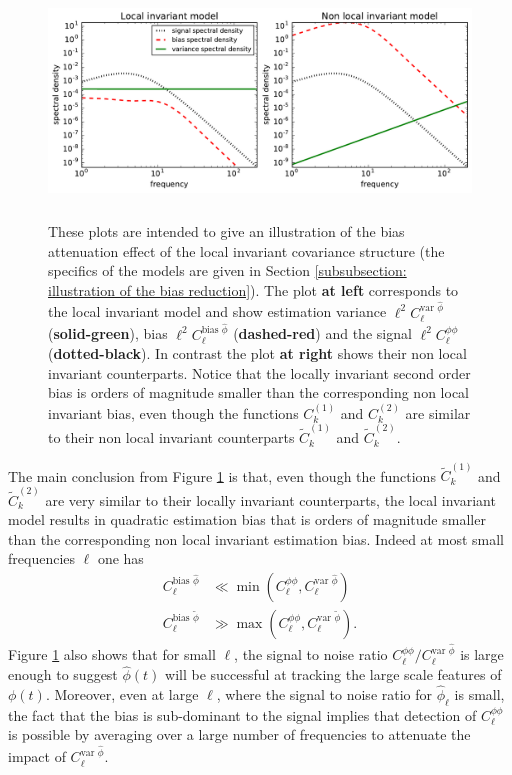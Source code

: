 \documentclass[10pt,noinfoline]{imsart}
\begin{document}
\begin{figure}[H]
\includegraphics[height=6.2cm]{figure1.pdf}
\caption{
 These plots are intended to give an illustration  of the bias attenuation effect of the local invariant covariance structure (the specifics of the models are given in Section \ref{subsubsection: illustration of the bias reduction}).  The plot \textbf{at left} corresponds to the local invariant model and show estimation variance $\ell^2 C_{\ell}^{\text{var }\hat \phi}$ (\textbf{solid-green}), bias $\ell^2 C_{\ell}^{\text{bias }\hat \phi}$ (\textbf{dashed-red}) and the signal $\ell^2 C_{\ell}^{\phi\phi}$ (\textbf{dotted-black}). In contrast the plot \textbf{at right} shows their non local invariant counterparts.  Notice that the locally invariant second order bias is orders of magnitude smaller than the corresponding non local invariant bias, even though the functions $ C^{(1)}_k$ and $ C^{(2)}_k$ are similar to their non local invariant counterparts  $\widetilde C^{(1)}_k$ and $\widetilde C^{(2)}_k$. }
\label{Figure 1}
\end{figure}

The main conclusion from Figure \ref{Figure 1} is that, even though the functions $\widetilde C^{(1)}_k$ and $\widetilde C^{(2)}_k$ are very similar to their locally invariant counterparts, the local invariant model results in quadratic estimation bias that is orders of magnitude smaller than the corresponding non local invariant estimation bias. Indeed at most small frequencies $\ell$ one has
\begin{align*}
 C_{\ell}^{\text{bias }\hat \phi} &\ll \min(C_{\ell}^{\phi\phi}, C_{\ell}^{\text{var }\hat \phi}) \\
 C_{\ell}^{\text{bias }\widetilde \phi} &\gg \max( C_{\ell}^{\phi\phi}, C_{\ell}^{\text{var }\widetilde \phi}).
\end{align*}
Figure \ref{Figure 1} also shows that for small $\ell$, the signal to noise ratio $C_{\ell}^{\phi\phi}/C_{\ell}^{\text{var }\hat \phi}$ is large enough to suggest $\hat\phi(t)$ will be successful at tracking the large scale features of $\phi(t)$. Moreover, even at large $\ell$, where the signal to noise ratio for $\hat\phi_{\ell}$ is small, the fact that the bias is sub-dominant to the signal implies that detection of $C_{\ell}^{\phi\phi}$ is possible by averaging over a large number of frequencies to attenuate the impact of $C_{\ell}^{\text{var }\hat \phi}$.
\end{document}
